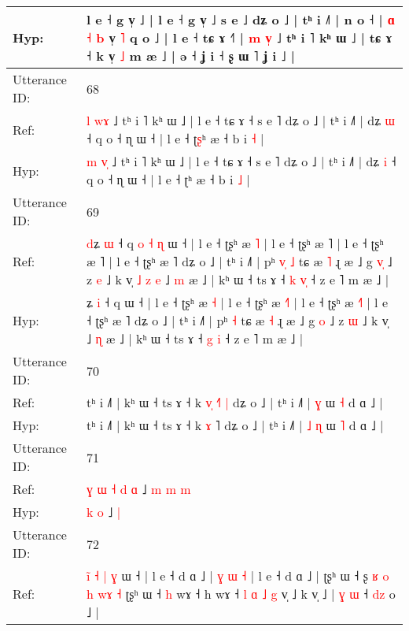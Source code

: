 \documentclass[10pt]{article}
\DeclareRobustCommand{\hl}[1]{{\textcolor{red}{#1}}}
\begin{document}
\begin{longtable}{ll}
 \\
Hyp: & l e ˧ g v̩ ˩ | l e ˧ g v̩ ˩ s e ˩ dʑ o ˩ | tʰ i ˩˥ | n o ˧\hl{} | \hl{}\hl{ɑ} \hl{}\hl{˧} \hl{b} v̩ \hl{˥} q o ˩ | l e ˧ tɕ ɤ ˧˥ | \hl{m} \hl{v}\hl{̩} ˩ tʰ i ˥ kʰ ɯ ˩ | tɕ ɤ ˧ k v̩ \hl{˩} m æ ˩ | ə ˧ ʝ i ˧ ʂ ɯ ˥ ʝ i ˩ |
 \\
\midrule
Utterance ID: & 68 \\
Ref: & \hl{l} \hl{w}\hl{ɤ} ˩ tʰ i ˥ kʰ ɯ ˩ | l e ˧ tɕ ɤ ˧ s e ˥ dʑ o ˩ | tʰ i ˩˥ | dʑ \hl{ɯ} ˧ q o ˧ ɳ ɯ ˧ | l e ˧ ʈ\hl{ʂ}ʰ æ ˧ b i \hl{˧} |
 \\
Hyp: & \hl{m} \hl{v}\hl{̩} ˩ tʰ i ˥ kʰ ɯ ˩ | l e ˧ tɕ ɤ ˧ s e ˥ dʑ o ˩ | tʰ i ˩˥ | dʑ \hl{i} ˧ q o ˧ ɳ ɯ ˧ | l e ˧ ʈ\hl{}ʰ æ ˧ b i \hl{˩} |
 \\
\midrule
Utterance ID: & 69 \\
Ref: & \hl{d}ʑ \hl{ɯ} ˧ q\hl{ }\hl{o}\hl{ }\hl{˧}\hl{ }\hl{ɳ} ɯ ˧ | l e ˧ ʈʂʰ æ \hl{˥} | l e ˧ ʈʂʰ æ \hl{}˥ | l e ˧ ʈʂʰ æ \hl{}˥ | l e ˧ ʈʂʰ æ ˥ dʑ o ˩ | tʰ i ˩˥ | pʰ\hl{ }\hl{v}\hl{̩} \hl{˩} tɕ æ \hl{˥} ɻ æ ˩ g \hl{v}\hl{̩} ˩ z \hl{e} ˩ k v̩\hl{ }\hl{˩}\hl{ }\hl{z}\hl{ }\hl{e} ˩ \hl{m} æ ˩ | kʰ ɯ ˧ ts ɤ ˧ \hl{k} \hl{v}\hl{̩} ˧ z e ˥ m æ ˩ |
 \\
Hyp: & \hl{}ʑ \hl{i} ˧ q\hl{}\hl{}\hl{}\hl{}\hl{}\hl{} ɯ ˧ | l e ˧ ʈʂʰ æ \hl{˧} | l e ˧ ʈʂʰ æ \hl{˧}˥ | l e ˧ ʈʂʰ æ \hl{˧}˥ | l e ˧ ʈʂʰ æ ˥ dʑ o ˩ | tʰ i ˩˥ | pʰ\hl{}\hl{}\hl{} \hl{˧} tɕ æ \hl{˧} ɻ æ ˩ g \hl{}\hl{o} ˩ z \hl{ɯ} ˩ k v̩\hl{}\hl{}\hl{}\hl{}\hl{}\hl{} ˩ \hl{ɳ} æ ˩ | kʰ ɯ ˧ ts ɤ ˧ \hl{g} \hl{}\hl{i} ˧ z e ˥ m æ ˩ |
 \\
\midrule
Utterance ID: & 70 \\
Ref: & tʰ i ˩˥ | kʰ ɯ ˧ ts ɤ ˧ k \hl{v}\hl{̩} \hl{˧}˥\hl{ }\hl{|} dʑ o ˩ | tʰ i ˩˥ |\hl{}\hl{} \hl{ɣ} ɯ \hl{˧} d ɑ ˩ |
 \\
Hyp: & tʰ i ˩˥ | kʰ ɯ ˧ ts ɤ ˧ k \hl{}\hl{ɤ} \hl{}˥\hl{}\hl{} dʑ o ˩ | tʰ i ˩˥ |\hl{ }\hl{˩} \hl{ɳ} ɯ \hl{˥} d ɑ ˩ |
 \\
\midrule
Utterance ID: & 71 \\
Ref: & \hl{ɣ}\hl{ }\hl{ɯ}\hl{ }\hl{˧}\hl{ }\hl{d} \hl{ɑ} ˩\hl{ }\hl{m}\hl{ }\hl{m} \hl{m}
 \\
Hyp: & \hl{}\hl{}\hl{}\hl{}\hl{}\hl{}\hl{k} \hl{o} ˩\hl{}\hl{}\hl{}\hl{} \hl{|}
 \\
\midrule
Utterance ID: & 72 \\
Ref: & \hl{i}\hl{̃} \hl{˧}\hl{ }\hl{|} \hl{ɣ} ɯ ˧\hl{} | l e ˧ d ɑ ˩ | \hl{ɣ} \hl{}\hl{ɯ} \hl{˧} | l e ˧ d ɑ ˩ | ʈʂʰ ɯ ˧ ʂ \hl{ʁ} \hl{o} \hl{h} \hl{w}\hl{ɤ} \hl{˧} ʈʂʰ ɯ ˧\hl{ }\hl{h} wɤ ˧ h wɤ ˧ \hl{l} \hl{}\hl{ɑ} \hl{˩} \hl{g} v̩\hl{}\hl{}\hl{}\hl{} ˩ k v̩ ˩ |\hl{}\hl{}\hl{}\hl{}\hl{}\hl{}\hl{} \hl{ɣ} \hl{}\hl{ɯ} ˧\hl{}\hl{}\hl{}\hl{}\hl{}\hl{}\hl{} \hl{d}\hl{z} o ˩ |

\end{longtable}
\end{document}
